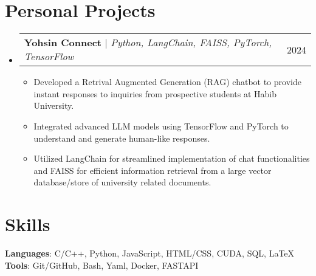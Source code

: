\documentclass{article}
\makeatletter
\newcommand{\resumeItem}[1]{
  \item\small{
    {#1 \vspace{-2pt}}
  }
}
\newcommand{\resumeProjectHeading}[2]{
    \item
    \begin{tabular*}{0.97\textwidth}{l@{\extracolsep{\fill}}r}
      \small#1 & #2 \\
    \end{tabular*}\vspace{-7pt}
}
\newcommand{\resumeSubHeadingListStart}{\begin{itemize}[leftmargin=0.15in, label={}]}
\newcommand{\resumeSubHeadingListEnd}{\end{itemize}}
\newcommand{\resumeItemListStart}{\begin{itemize}}
\newcommand{\resumeItemListEnd}{\end{itemize}\vspace{-5pt}}
\makeatother
\begin{document}
\section{Personal Projects}
\resumeSubHeadingListStart

    \resumeProjectHeading
    {\textbf{Yohsin Connect} $|$ \footnotesize\emph{Python, LangChain, FAISS, PyTorch, TensorFlow}}{2024}
    \resumeItemListStart
        \resumeItem{Developed a Retrival Augmented Generation (RAG) chatbot to provide instant responses to inquiries from prospective students at Habib University.}
        \resumeItem{Integrated advanced LLM models using TensorFlow and PyTorch to understand and generate human-like responses.}
        \resumeItem{Utilized LangChain for streamlined implementation of chat functionalities and FAISS for efficient information retrieval from a large vector database/store of university related documents.}
    \resumeItemListEnd
\resumeSubHeadingListEnd



\section{Skills}
 \begin{itemize}[leftmargin=0.15in, label={}]
    \small{\item{
     \textbf{Languages}{: C/C++, Python, JavaScript, HTML/CSS, CUDA, SQL, LaTeX }\\
     \textbf{Tools}{: Git/GitHub, Bash, Yaml, Docker, FASTAPI }\\
    }}
 \end{itemize}
\end{document}

